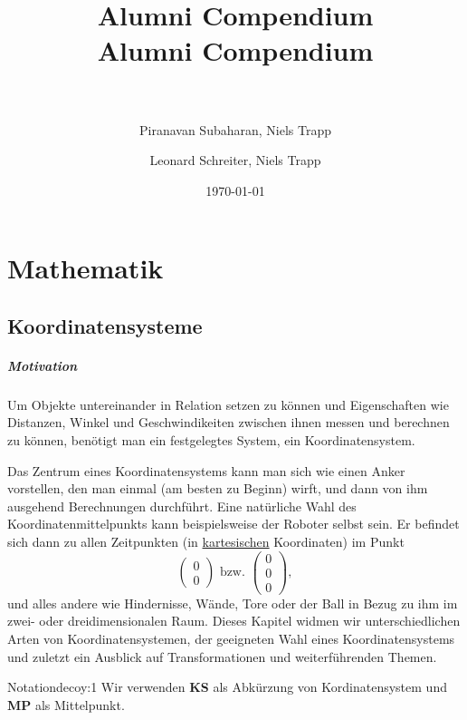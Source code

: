 \documentclass[12pt,a4paper]{report}
\title{Alumni Compendium}           %
\title{\horrule{3pt} \\[0.4cm]%
	Alumni Compendium\\%
	\horrule{3pt} \\[0.5cm]}
\author{Piranavan Subaharan, Niels Trapp}
\author{Leonard Schreiter, Niels Trapp}          %
\date{\today}           %
\begin{document}
	\maketitle
	\tableofcontents

	\chapter{Mathematik}
	 \section{Koordinatensysteme}
	  \paragraph{Motivation}

		  Um Objekte untereinander in Relation setzen zu können und Eigenschaften wie Distanzen, Winkel und Geschwindikeiten zwischen ihnen messen und berechnen zu können, benötigt man ein festgelegtes System, ein Koordinatensystem.

		  Das Zentrum eines Koordinatensystems kann man sich wie einen Anker vorstellen, den man einmal (am besten zu Beginn) wirft, und dann von ihm ausgehend Berechnungen durchführt.
		  Eine natürliche Wahl des Koordinatenmittelpunkts kann beispielsweise der Roboter selbst sein.
		  Er befindet sich dann zu allen Zeitpunkten (in \hyperref[Mathe_KS_kartesisch]{kartesischen} Koordinaten) im Punkt
		  \begin{equation*}
			  \begin{pmatrix}0\\0\end{pmatrix} \text{ bzw. }\begin{pmatrix}0\\0\\0\end{pmatrix},
		  \end{equation*}
		  und alles andere wie Hindernisse, Wände, Tore oder der Ball in Bezug zu ihm im zwei- oder dreidimensionalen Raum.
		  Dieses Kapitel widmen wir unterschiedlichen Arten von Koordinatensystemen, der geeigneten Wahl eines Koordinatensystems und zuletzt ein Ausblick auf Transformationen und weiterführenden Themen.

		  \begin{bemerkung}{Notation}{decoy:1}
			  Wir verwenden \textbf{KS} als Abkürzung von Kordinatensystem und \textbf{MP} als Mittelpunkt.
		  \end{bemerkung}
\end{document}
